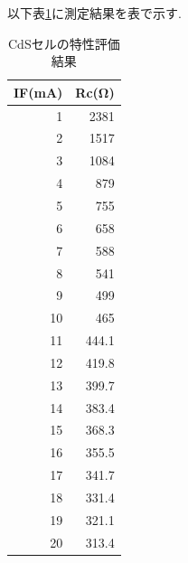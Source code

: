 \documentclass[titlepage]{jarticle}
\begin{document}
以下表\ref{CdSセルの特性評価結果}に測定結果を表で示す.
\begin{table}[htbp]
    \begin{center}
        \caption{CdSセルの特性評価結果}
        \begin{tabular}{r|r}
            \hline\hline
            \multicolumn{1}{l|}{IF(mA)} & \multicolumn{1}{l}{Rc(Ω)} \\ \hline
            1                           & 2381                      \\ \hline
            2                           & 1517                      \\ \hline
            3                           & 1084                      \\ \hline
            4                           & 879                       \\ \hline
            5                           & 755                       \\ \hline
            6                           & 658                       \\ \hline
            7                           & 588                       \\ \hline
            8                           & 541                       \\ \hline
            9                           & 499                       \\ \hline
            10                          & 465                       \\ \hline
            11                          & 444.1                     \\ \hline
            12                          & 419.8                     \\ \hline
            13                          & 399.7                     \\ \hline
            14                          & 383.4                     \\ \hline
            15                          & 368.3                     \\ \hline
            16                          & 355.5                     \\ \hline
            17                          & 341.7                     \\ \hline
            18                          & 331.4                     \\ \hline
            19                          & 321.1                     \\ \hline
            20                          & 313.4                     \\ \hline
        \end{tabular}
        \label{CdSセルの特性評価結果}
    \end{center}
\end{table}
\end{document}
